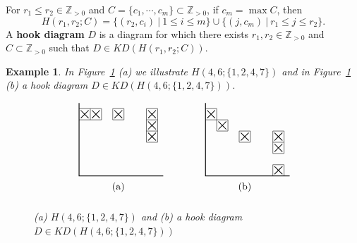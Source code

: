 \documentclass[letterpaper,10pt]{article}
\newtheorem{ex}[theorem]{Example}
\begin{document}
For $r_1\le r_2\in\mathbb{Z}_{>0}$ and $C=\{c_1,\cdots,c_m\}\subset\mathbb{Z}_{>0}$, if $c_m=\max C$, then $$H(r_1,r_2;C)=\{(r_2,c_i)~|~1\le i\le m\}\cup\{(j,c_m)~|~r_1\le j\le r_2\}.$$ A \textbf{hook diagram} $D$ is a diagram for which there exists $r_1,r_2\in \mathbb{Z}_{>0}$ and $C\subset\mathbb{Z}_{>0}$ such that $D\in KD(H(r_1,r_2;C))$.

\begin{ex}\label{ex:hook}
    In Figure~\ref{fig:hook} \textup{(a)} we illustrate $H(4,6;\{1,2,4,7\})$ and in Figure~\ref{fig:hook} \textup{(b)} a hook diagram $D\in KD(H(4,6;\{1,2,4,7\}))$.
    \begin{figure}[H]
        \centering
        $$\begin{tikzpicture}[scale=0.4]
    \draw[thick] (7.5,-1)--(0,-1)--(0,5.5);
        \draw (0,4)--(2,4)--(2,5)--(0,5);
        \draw (1,4)--(1,5);
        \node at (1.5,4.5){$\bigtimes$};
        \node at (0.5,4.5){$\bigtimes$};

        \draw (3,4)--(4,4)--(4,5)--(3,5)--(3,4);
        \node at (3.5,4.5){$\bigtimes$};

        \draw (6,2)--(7,2)--(7,5)--(6,5)--(6,2);
        \draw (6,3)--(7,3);
        \draw (6,4)--(7,4);
        \node at (6.5,2.5){$\bigtimes$};
        \node at (6.5,3.5){$\bigtimes$};
        \node at (6.5,4.5){$\bigtimes$};
        \node at (3.5, -2) {(a)};
\end{tikzpicture}\quad\quad\quad\quad\begin{tikzpicture}[scale=0.4]
    \draw[thick] (7.5,-1)--(0,-1)--(0,5.5);
        \draw (0,4)--(1,4)--(1,5)--(0,5);
        \node at (0.5,4.5){$\bigtimes$};

        \draw (1,3)--(2,3)--(2,4)--(1,4)--(1,3);
        \node at (1.5,3.5){$\bigtimes$};

        \draw (3,2)--(4,2)--(4,3)--(3,3)--(3,2);
        \node at (3.5,2.5){$\bigtimes$};

        \draw (7,1)--(7,3)--(6,3)--(6,1)--(7,1);
        \draw (6,2)--(7,2);

        \draw (6,-1)--(6,0)--(7,0)--(7,-1);
        \node at (6.5,-0.5){$\bigtimes$};
        \node at (6.5,1.5){$\bigtimes$};
        \node at (6.5,2.5){$\bigtimes$};
        \node at (3.5, -2) {(b)};
\end{tikzpicture}$$
        \caption{(a) $H(4,6;\{1,2,4,7\})$ and (b) a hook diagram $D\in KD(H(4,6;\{1,2,4,7\}))$}
        \label{fig:hook}
    \end{figure}
\end{ex}
\end{document}
